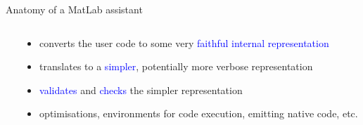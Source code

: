 \documentclass[handout]{beamer}
\newcommand{\keyword}[1]{\textcolor{blue}{#1}}
\begin{document}
\begin{frame}{Anatomy of a MatLab assistant}
\begin{columns}
\begin{column}{0.3\textwidth}
  \end{column}
  \begin{column}{0.55\textwidth}
    \begin{itemize}
      \item converts the user code to some very \keyword{faithful internal representation}
      \vspace{0.5em}\item translates to a \keyword{simpler}, potentially more verbose representation
      \vspace{0.2em}\item \keyword{validates} and \keyword{checks} the simpler representation
      \vspace{1em}\item optimisations, environments for code execution, emitting native code, etc.
    \end{itemize}
  \end{column}
  \end{columns}
\end{frame}
\end{document}
